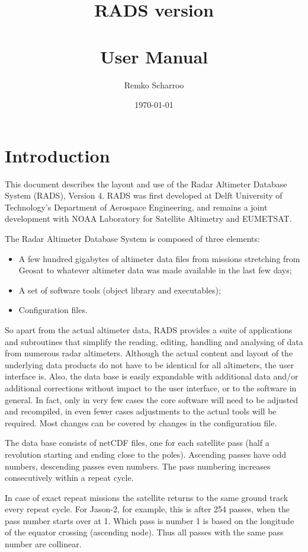 \documentclass[a4paper,11pt,openany,natbib,nomargin]{thesis}
\title{RADS version \vernum \\ ~ \\
User Manual}
\author{Remko Scharroo}
\date{\today}
\begin{document}
\maketitle
\tableofcontents

\chapter{Introduction}

\label{ch:intro}

This document describes the layout and use of the Radar Altimeter Database System (RADS), Version 4. RADS was first developed at Delft University of Technology's Department of Aerospace Engineering, and remains a joint development with NOAA Laboratory for Satellite Altimetry and EUMETSAT.

The Radar Altimeter Database System is composed of three elements:
\begin{itemize}
\item A few hundred gigabytes of altimeter data files from missions stretching from Geosat to whatever altimeter data was made available in the last few days;
\item A set of software tools (object library and executables);
\item Configuration files.
\end{itemize}

So apart from the actual altimeter data, RADS provides a suite of applications and subroutines that simplify the reading, editing, handling and analysing of data from numerous radar altimeters. Although the actual content and layout of the underlying data products do not have to be identical for all altimeters, the user interface is. Also, the data base is easily expandable with additional data and/or additional corrections without impact to the user interface, or to the software in general. In fact, only in very few cases the core software will need to be adjusted and recompiled, in even fewer cases adjustments to the actual tools will be required. Most changes can be covered by changes in the configuration file.

The data base consists of netCDF files, one for each satellite pass (half a revolution starting and ending close to the poles). Ascending passes have odd numbers, descending passes even numbers. The pass numbering increases consecutively within a repeat cycle. 

In case of exact repeat missions the satellite returns to the same ground track every repeat cycle. For Jason-2, for example, this is after 254 passes, when the pass number starts over at 1. Which pass is number 1 is based on the longitude of the equator crossing (ascending node). Thus all passes with the same pass number are collinear.
\end{document}
